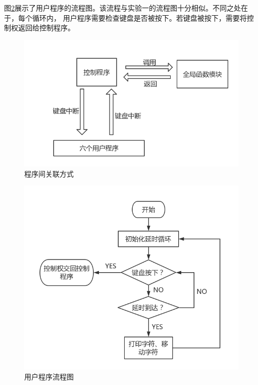 \documentclass[a4paper]{article}
\begin{document}
    图\ref{fig:program}展示了用户程序的流程图。该流程与实验一的流程图十分相似。不同之处在于，每个循环内，
    用户程序需要检查键盘是否被按下。若键盘被按下，需要将控制权返回给控制程序。

    
    \begin{figure}
        \begin{center}
        \includegraphics[scale=0.4]{assets/overview.png}
        \caption{程序间关联方式\label{fig:overview}}
        \end{center} 
    \end{figure} 
    
    
    \begin{figure}
        \begin{center}
        \includegraphics[scale=0.4]{assets/program.png}
        \caption{用户程序流程图\label{fig:program}} 
        \end{center} 
    \end{figure} 
    
\end{document}
